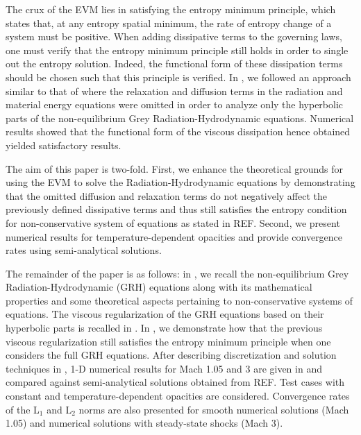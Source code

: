 \documentclass[times,doublespace]{fldauth}%
\begin{document}
The crux of the EVM lies in satisfying the entropy minimum principle, which states that, at any entropy spatial 
minimum, the rate of entropy change of a system must be positive. When
adding dissipative terms to the governing laws, one must verify that the entropy minimum principle still holds in 
order to single out the entropy solution. Indeed, the functional form of these dissipation terms
should be chosen such that this principle is verified. In \cite{our_jcp_radhy_paper}, we followed an approach 
similar to that of \cite{Balsara, LowrieMorel} 
where the relaxation and diffusion terms in the radiation and material energy equations were omitted in order to 
analyze only the hyperbolic parts of 
the non-equilibrium Grey Radiation-Hydrodynamic equations. Numerical results showed that the functional form of the 
viscous dissipation hence obtained yielded satisfactory results. 

The aim of this paper is two-fold. First, we enhance the theoretical grounds for using the EVM to solve the 
Radiation-Hydrodynamic equations by demonstrating that the omitted diffusion
and relaxation terms do not negatively affect the previously defined dissipative terms and thus still satisfies the 
entropy condition for non-conservative system of equations as stated in REF. Second, we present numerical
results for temperature-dependent opacities and provide convergence rates using semi-analytical solutions.

The remainder of the paper is as follows: in , we recall
the non-equilibrium Grey Radiation-Hydrodynamic (GRH) equations along with its mathematical properties and some 
theoretical aspects pertaining to non-conservative systems of equations. 
The viscous regularization of the GRH equations based on their hyperbolic parts is recalled in .
In , we demonstrate how that the previous viscous regularization still satisfies the entropy minimum 
principle when one considers the full GRH equations.
After describing discretization and solution techniques in , 1-D numerical results for Mach 1.05 and 
3 are given in  and compared against semi-analytical solutions obtained from REF. Test cases with 
constant and temperature-dependent opacities are considered. 
Convergence rates of the L$_1$ and L$_2$ norms are also presented for smooth numerical solutions 
(Mach 1.05) and numerical solutions with steady-state shocks (Mach 3).
%
\end{document}

